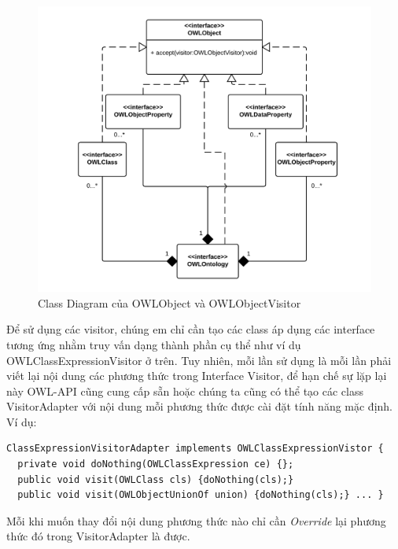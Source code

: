 {\begin{figure}[h!]
	\centering
	\includegraphics[width=145mm]{Figures/uml_classdiagram_owlobject_forvisitor_nobackground.png}
	\caption{Class Diagram của OWLObject và OWLObjectVisitor \label{overflow}}
\end{figure}
Để sử dụng các visitor, chúng em chỉ cần tạo các class áp dụng các interface tương ứng nhằm truy vấn dạng thành phần cụ thể như ví dụ OWLClassExpressionVisitor ở trên. Tuy nhiên, mỗi lần sử dụng là mỗi lần phải viết lại nội dung các phương thức trong Interface Visitor, để hạn chế sự lặp lại này OWL-API cũng cung cấp sẵn hoặc chúng ta cũng có thể tạo các class VisitorAdapter với nội dung mỗi phương thức được cài đặt tính năng mặc định. Ví dụ:
\begin{verbatim}
ClassExpressionVisitorAdapter implements OWLClassExpressionVistor {
  private void doNothing(OWLClassExpression ce) {};
  public void visit(OWLClass cls) {doNothing(cls);}
  public void visit(OWLObjectUnionOf union) {doNothing(cls);} ... }
\end{verbatim}
Mỗi khi muốn thay đổi nội dung phương thức nào chỉ cần \textit{Override} lại phương thức đó trong VisitorAdapter là được.
}
